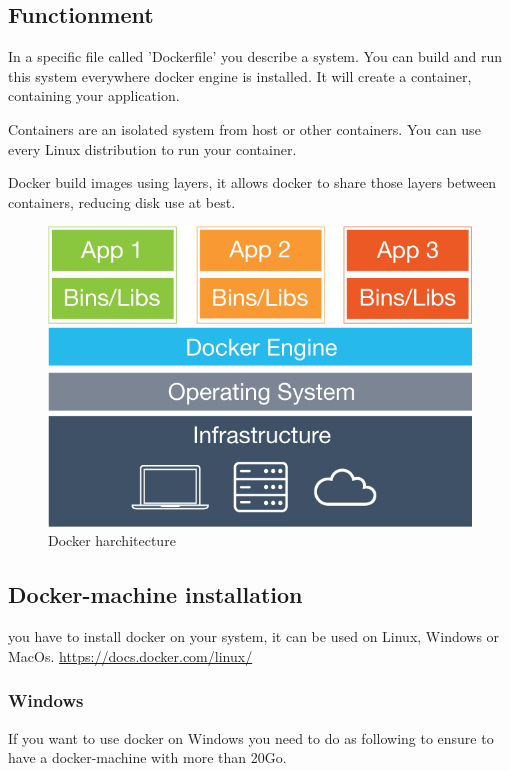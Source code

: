 \documentclass[a4paper,11pt]{report}
\begin{document}
\subsection{Functionment}
In a specific file called 'Dockerfile' you describe a system. You can build and run this system everywhere docker engine is installed. It will create a container, containing your application.

Containers are an isolated system from host or other containers. You can use every Linux distribution to run your container.

Docker build images using layers, it allows docker to share those layers between containers, reducing disk use at best.

\begin{figure}[H]
	\begin{center}
		\includegraphics[scale=0.35]{img/what-is-vm-diagram}
		\caption{Docker harchitecture}
	\end{center}
\end{figure}
\newpage
\subsection{Docker-machine installation}
you have to install docker on your system, it can be used on Linux, Windows or MacOs. \url{https://docs.docker.com/linux/}

\subsubsection{Windows}
If you want to use docker on Windows you need to do as following to ensure to have a docker-machine with more than 20Go.
\end{document}
